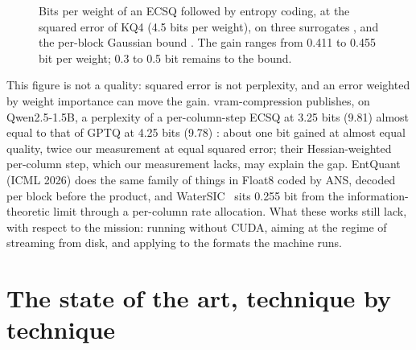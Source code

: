 \begin{figure}[ht]
\centering
\GrapheRdProxy
\caption[At equal error, what an ECSQ needs]{Bits per weight of an ECSQ followed by entropy coding, at the squared error of KQ4 (4.5 bits per weight), on three surrogates \mes, and the per-block Gaussian bound \calc. The gain ranges from 0.411 to 0.455 bit per weight; 0.3 to 0.5 bit remains to the bound.}
\label{fig:ent-ecsq}
\end{figure}

This figure is not a quality: squared error is not perplexity, and an error weighted by weight importance can move the gain. vram-compression publishes, on Qwen2.5-1.5B, a perplexity of a per-column-step ECSQ at 3.25 bits (9.81) almost equal to that of GPTQ at 4.25 bits (9.78) \litt: about one bit gained at almost equal quality, twice our measurement at equal squared error; their Hessian-weighted per-column step, which our measurement lacks, may explain the gap. EntQuant~\cite{putzky2026entquant} (ICML 2026) does the same family of things in Float8 coded by ANS, decoded per block before the product, and WaterSIC~\cite{lifar2026watersic} sits 0.255 bit from the information-theoretic limit through a per-column rate allocation. What these works still lack, with respect to the mission: running without CUDA, aiming at the regime of streaming from disk, and applying to the formats the machine runs.

\section{The state of the art, technique by technique}\label{sec:ent-etat}

